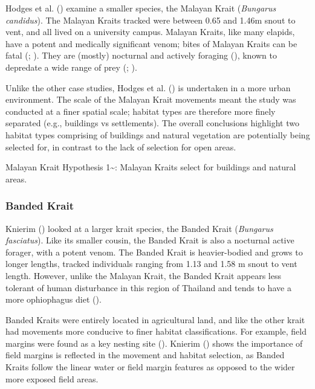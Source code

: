 \documentclass[10pt,a4paper]{article}
\begin{document}
Hodges et al. () examine a smaller species, the Malayan Krait (\emph{Bungarus candidus}).
The Malayan Kraits tracked were between 0.65 and 1.46m snout to vent, and all lived on a university campus.
Malayan Kraits, like many elapids, have a potent and medically significant venom; bites of Malayan Kraits can be fatal (; ).
They are (mostly) nocturnal and actively foraging (), known to depredate a wide range of prey (; ).

Unlike the other case studies, Hodges et al. () is undertaken in a more urban environment.
The scale of the Malayan Krait movements meant the study was conducted at a finer spatial scale; habitat types are therefore more finely separated (e.g., buildings vs settlements).
The overall conclusions highlight two habitat types comprising of buildings and natural vegetation are potentially being selected for, in contrast to the lack of selection for open areas.

Malayan Krait Hypothesis 1\textasciitilde: Malayan Kraits select for buildings and natural areas.

\subsubsection{Banded Krait}\label{banded-krait}

Knierim () looked at a larger krait species, the Banded Krait (\emph{Bungarus fasciatus}).
Like its smaller cousin, the Banded Krait is also a nocturnal active forager, with a potent venom.
The Banded Krait is heavier-bodied and grows to longer lengths, tracked individuals ranging from 1.13 and 1.58 m snout to vent length.
However, unlike the Malayan Krait, the Banded Krait appears less tolerant of human disturbance in this region of Thailand and tends to have a more ophiophagus diet ().

Banded Kraits were entirely located in agricultural land, and like the other krait had movements more conducive to finer habitat classifications.
For example, field margins were found as a key nesting site ().
Knierim () shows the importance of field margins is reflected in the movement and habitat selection, as Banded Kraits follow the linear water or field margin features as opposed to the wider more exposed field areas.
\end{document}
